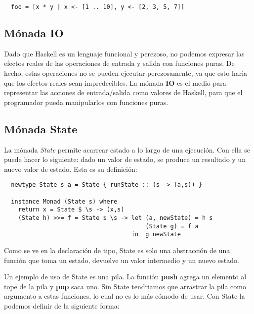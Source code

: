 \begin{lstlisting}
  foo = [x * y | x <- [1 .. 10], y <- [2, 3, 5, 7]]
\end{lstlisting}


\subsection{Mónada IO} %

Dado que Haskell es un lenguaje funcional y perezoso, no podemos expresar las
efectos reales de las operaciones de entrada y salida con funciones puras. De
hecho, estas operaciones no se pueden ejecutar perezosamente, ya que esto
haria que los efectos reales sean impredecibles. La mónada \textbf{IO} es el
medio para representar las acciones de entrada/salida como valores de Haskell,
para que el programador pueda manipularlos con funciones puras.


\label{sub:m_nada_io}



\subsection{Mónada State} %
\label{sub:m_nada_state}

La mónada \textit{State} permite acarrear estado a lo largo de una ejecución.
Con ella se puede hacer lo siguiente: dado un valor de estado, se produce un
resultado y un nuevo valor de estado. Esta es su definición:

\begin{lstlisting}
  newtype State s a = State { runState :: (s -> (a,s)) }

  instance Monad (State s) where
    return x = State $ \s -> (x,s)
    (State h) >>= f = State $ \s -> let (a, newState) = h s
                                        (State g) = f a
                                    in  g newState
\end{lstlisting}

Como se ve en la declaración de tipo, State es solo una abstracción
de una función que toma un estado, devuelve un valor intermedio y un nuevo
estado.

Un ejemplo de uso de State es una pila. La función \textbf{push}
agrega un elemento al tope de la pila y \textbf{pop} saca uno. Sin State
tendriamos que arrastrar la pila como argumento a estas funciones, lo cual
no es lo más cómodo de usar. Con State la podemos definir de la siguiente
forma:

